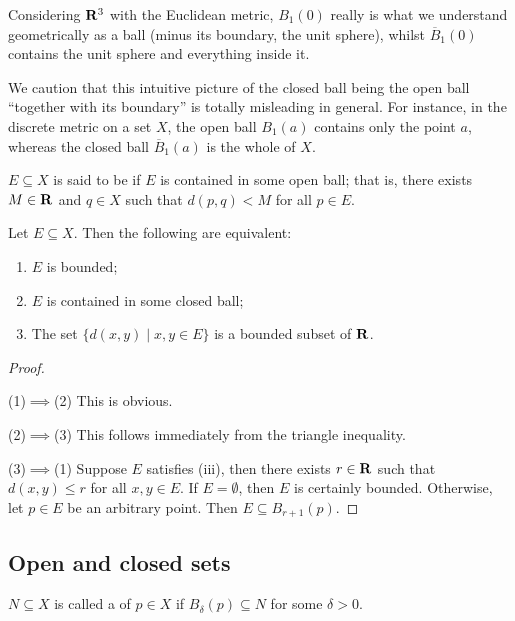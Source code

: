 \begin{example}
Considering $\mathbf R^3$ with the Euclidean metric, $B_1(0)$ really is what we understand geometrically as a ball (minus its boundary, the unit sphere), whilst $\overline{B}_1(0)$ contains the unit sphere and everything inside it.
\end{example}

\begin{remark}
We caution that this intuitive picture of the closed ball being the open ball ``together with its boundary'' is totally misleading in general. For instance, in the discrete metric on a set $X$, the open ball $B_1(a)$ contains only the point $a$, whereas the closed ball $\overline{B}_1(a)$ is the whole of $X$.
\end{remark}

\begin{definition}[Bounded]
$E\subseteq X$ is said to be  if $E$ is contained in some open ball; that is, there exists $M\in\mathbf R$ and $q\in X$ such that $d(p,q)<M$ for all $p\in E$.
\end{definition}

\begin{proposition}
Let $E\subseteq X$. Then the following are equivalent:
\begin{enumerate}[label=(\arabic*)]
\item $E$ is bounded;
\item $E$ is contained in some closed ball;
\item The set $\{d(x,y)\mid x,y\in E\}$ is a bounded subset of $\mathbf R$.
\end{enumerate}
\end{proposition}

\begin{proof} \

(1)$\implies$(2) This is obvious.

(2)$\implies$(3) This follows immediately from the triangle inequality.

(3)$\implies$(1) Suppose $E$ satisfies (iii), then there exists $r\in\mathbf R$ such that $d(x,y)\le r$ for all $x,y\in E$. If $E=\emptyset$, then $E$ is certainly bounded. Otherwise, let $p\in E$ be an arbitrary point. Then $E\subseteq B_{r+1}(p)$.
\end{proof}

\subsection{Open and closed sets}
\begin{definition}[Neighbourhood]
$N\subseteq X$ is called a  of $p\in X$ if $B_\delta(p)\subseteq N$ for some $\delta>0$.
\end{definition}

